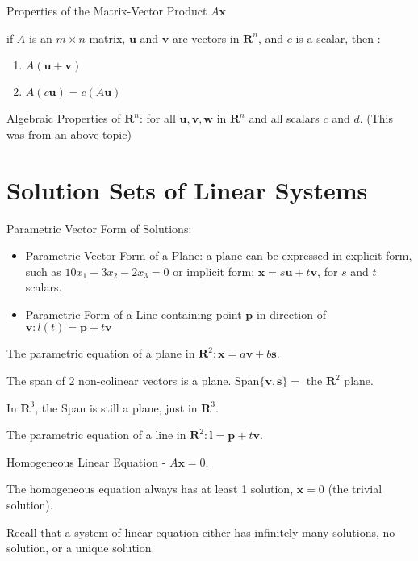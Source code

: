 \documentclass[../linalg.tex]{subfiles}
\begin{document}
Properties of the Matrix-Vector Product $A\textbf{x}$
\begin{theorem}
    if $A$ is an $m\times n$ matrix, $\textbf{u}$ and $\textbf{v}$ are vectors in $\textbf{R}^n$, and $c$ is a scalar, then : 
    \begin{enumerate}
        \item $A(\textbf{u}+\textbf{v})$
        \item $A(c\textbf{u})=c(A\textbf{u})$
    \end{enumerate}
\end{theorem}

Algebraic Properties of $\textbf{R}^n$: for all $\textbf{u},\textbf{v},\textbf{w}$ in $\textbf{R}^n$ and all scalars $c$ and $d$. (This was from an above topic)



\section{Solution Sets of Linear Systems}
Parametric Vector Form of Solutions:
\begin{itemize}
    \item Parametric Vector Form of a Plane: a plane can be expressed in explicit form, such as $10x_1-3x_2-2x_3=0$ or implicit form: $\textbf{x}=s\textbf{u}+t\textbf{v}$, for $s$ and $t$ scalars.
    \item Parametric Form of a Line containing point $\textbf{p}$ in direction of $\textbf{v}: l(t)=\textbf{p}+t\textbf{v}$
\end{itemize}

The parametric equation of a plane in $\textbf{R}^2: \textbf{x}=a\textbf{v}+b\textbf{s}$.

The span of 2 non-colinear vectors is a plane. Span$\{\textbf{v},\textbf{s}\} = $ the $\textbf{R}^2$ plane.

In $\textbf{R}^3$, the Span is still a plane, just in $\textbf{R}^3$.

The parametric equation of a line in $\textbf{R}^2: \textbf{l}=\textbf{p}+t\textbf{v}$.

Homogeneous Linear Equation - $A\textbf{x}=0$.

The homogeneous equation always has at least 1 solution, $\textbf{x}=0$ (the trivial solution).

Recall that a system of linear equation either has infinitely many solutions, no solution, or a unique solution.
\end{document}
